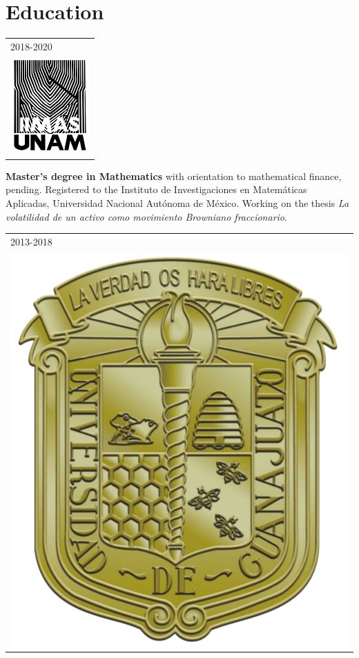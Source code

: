 \documentclass[]{friggeri-cv}
\begin{document}
\section{Education}
\begin{entrylist}
  \entry
     {   \begin{tabular}{l}
    		\hspace{0.8cm}2018-2020\\
     		\hspace{0.9cm}\includegraphics[scale=0.4]{img/iimas.png}
	\end{tabular}
    }
    {\vspace{-1.46cm}}
    { }
    {\textbf{Master's degree in Mathematics} with orientation to mathematical finance, pending.
Registered to the Instituto de Investigaciones en Matemáticas Aplicadas, Universidad Nacional Autónoma de México. Working on the thesis \textsl{La volatilidad de un activo como movimiento Browniano fraccionario}.}
    \entry
    {   \begin{tabular}{l}
    		\hspace{0.8cm}2013-2018\\
     		\hspace{0.9cm}\includegraphics[scale=0.5]{img/UGTO.png}

\end{tabular}}
\end{entrylist}
\end{document}
